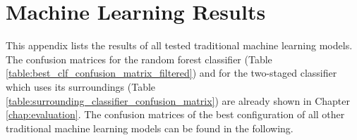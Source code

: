 \chapter{Machine Learning Results}
\label{appendix:ml_results}

This appendix lists the results of all tested traditional machine learning models. The confusion matrices for the random forest classifier (Table \ref{table:best_clf_confusion_matrix_filtered}) and for the two-staged classifier which uses its surroundings (Table \ref{table:surrounding_classifier_confusion_matrix}) are already shown in Chapter \ref{chap:evaluation}. The confusion matrices of the best configuration of all other traditional machine learning models can be found in the following.








